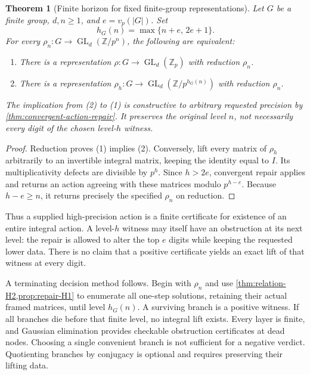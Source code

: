 \documentclass[11pt]{article}
\newtheorem{theorem}{Theorem}[section]
\theoremstyle{definition}
\theoremstyle{remark}
\begin{document}
\begin{theorem}[Finite horizon for fixed finite-group representations]\label{thm:finite-action-horizon}
Let $G$ be a finite group, $d,n\geq1$, and $e=v_p(|G|)$. Set
\[
 \boxed{h_G(n)=\max\{n+e,\,2e+1\}.}
\]
For every $\rho_n:G\to\operatorname{GL}_d(\mathbb Z/p^n)$, the following are equivalent:
\begin{enumerate}
\item There is a representation $\rho:G\to\operatorname{GL}_d(\mathbb Z_p)$ with reduction $\rho_n$.
\item There is a representation $\rho_h:G\to\operatorname{GL}_d(\mathbb Z/p^{h_G(n)})$ with reduction $\rho_n$.
\end{enumerate}
The implication from (2) to (1) is constructive to arbitrary requested precision by \cref{thm:convergent-action-repair}. It preserves the original level $n$, not necessarily every digit of the chosen level-$h$ witness.
\end{theorem}
\begin{proof}
Reduction proves (1) implies (2). Conversely, lift every matrix of $\rho_h$ arbitrarily to an invertible integral matrix, keeping the identity equal to $I$. Its multiplicativity defects are divisible by $p^h$. Since $h>2e$, convergent repair applies and returns an action agreeing with these matrices modulo $p^{h-e}$. Because $h-e\geq n$, it returns precisely the specified $\rho_n$ on reduction.
\end{proof}

Thus a supplied high-precision action is a finite certificate for existence of an entire integral action. A level-$h$ witness may itself have an obstruction at its next level: the repair is allowed to alter the top $e$ digits while keeping the requested lower data. There is no claim that a positive certificate yields an exact lift of that witness at every digit.

A terminating decision method follows. Begin with $\rho_n$ and use \cref{thm:relation-H2,prop:repair-H1} to enumerate all one-step solutions, retaining their actual framed matrices, until level $h_G(n)$. A surviving branch is a positive witness. If all branches die before that finite level, no integral lift exists. Every layer is finite, and Gaussian elimination provides checkable obstruction certificates at dead nodes. Choosing a single convenient branch is not sufficient for a negative verdict. Quotienting branches by conjugacy is optional and requires preserving their lifting data.
\end{document}
